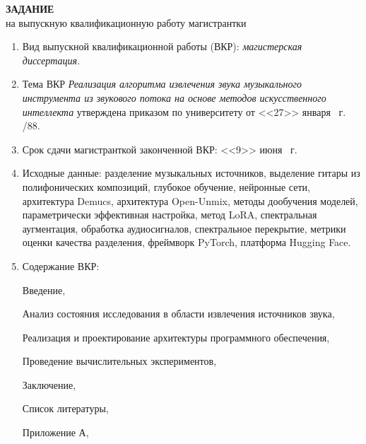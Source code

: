\documentclass[14pt]{extarticle}
\begin{document}
\begin{center}
	\small
	\textbf{ЗАДАНИЕ} \\
	на выпускную квалификационную работу магистрантки \\[0.3em]
	\noindent
	\underline{}
\end{center}
\vspace{1em}
\begin{enumerate}[label=\arabic*., leftmargin=0pt, labelsep=0.25em, itemindent=13pt, itemsep=6pt] %
	\small\linespread{1}\selectfont
	\item Вид выпускной квалификационной работы (ВКР): \textit {магистерская диссертация.}
	\item Тема ВКР \textit{Реализация алгоритма извлечения звука музыкального инструмента из звукового потока на основе методов искусственного интеллекта} 
	утверждена приказом по университету от <<27>> января \the\year \ г. /88.
	\item Срок сдачи магистранткой законченной ВКР: <<9>> июня \the\year \ г.
	\item Исходные данные: разделение музыкальных источников, выделение гитары из полифонических композиций, глубокое обучение, нейронные сети, архитектура Demucs, архитектура Open-Unmix, методы дообучения моделей, параметрически эффективная настройка, метод LoRA, спектральная аугментация, обработка аудиосигналов, спектральное перекрытие, метрики оценки качества разделения, фреймворк PyTorch, платформа Hugging Face.
	\item Содержание ВКР:\par
	\hspace{13pt}Введение,\par
	\hspace{13pt}Анализ состояния исследования в области извлечения источников звука,\par
	\hspace{13pt}Реализация и проектирование архитектуры программного обеспечения,\par
	\hspace{13pt}Проведение вычислительных экспериментов,\par
	\hspace{13pt}Заключение,\par
	\hspace{13pt}Список литературы,\par
	\hspace{13pt}Приложение А,\par

\end{enumerate}
\end{document}

